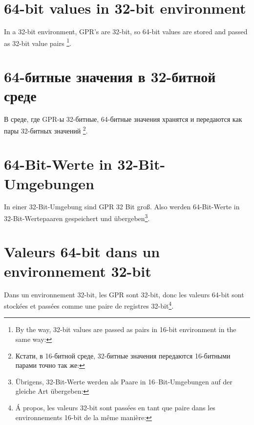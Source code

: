 \ifdefined\ENGLISH
\section{64-bit values in 32-bit environment}
\label{sec:64bit_in_32_env}

In a 32-bit environment, \ac{GPR}'s are 32-bit, so 64-bit values are stored and passed as 32-bit value pairs
\footnote{By the way, 32-bit values are passed as pairs in 16-bit environment in the same way: }.
\fi

\ifdefined\RUSSIAN
\section{64-битные значения в 32-битной среде}
\label{sec:64bit_in_32_env}

В среде, где \ac{GPR}-ы 32-битные, 64-битные значения хранятся и передаются как пары 32-битных значений
\footnote{Кстати, в 16-битной среде, 32-битные значения передаются 16-битными парами точно так же: }.
\fi

\ifdefined\GERMAN
\section{64-Bit-Werte in 32-Bit-Umgebungen}
\label{sec:64bit_in_32_env}

In einer 32-Bit-Umgebung sind \ac{GPR} 32 Bit groß. Also werden 64-Bit-Werte in
32-Bit-Wertepaaren gespeichert und übergeben\footnote{Übrigens, 32-Bit-Werte werden
als Paare in 16--Bit-Umgebungen auf der gleiche Art übergeben: }.
\fi

\ifdefined\FRENCH
\section{Valeurs 64-bit dans un environnement 32-bit}
\label{sec:64bit_in_32_env}

Dans un environnement 32-bit, les \ac{GPR} sont 32-bit, donc les valeurs 64-bit sont
stockées et passées comme une paire de registres 32-bit\footnote{Á propos, les valeurs
32-bit sont passées en tant que paire dans les environnements 16-bit de la même manière:
}.
\fi







